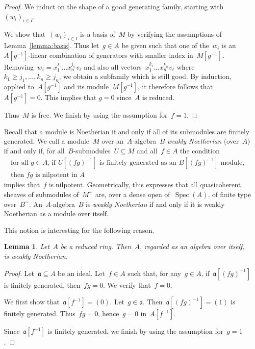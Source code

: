 \documentclass{amsart}
\theoremstyle{definition}
\theoremstyle{plain}
\newtheorem{lemma}[defn]{Lemma}
\theoremstyle{remark}
\newcommand{\aaa}{\mathfrak{a}}
\DeclareMathOperator{\Spec}{Spec}
\begin{document}
\begin{proof}
We induct on the shape of a good generating family, starting with~$(w_i)_{i \in I}$.

We show that~$(w_i)_{i \in I}$ is a basis of~$M$ by verifying the assumptions
of Lemma~\ref{lemma:basis}. Thus let~$g \in A$ be given such that one of
the~$w_i$ is an $A[g^{-1}]$-linear combination of generators with smaller index
in~$M[g^{-1}]$. Removing~$w_i = x_1^{j_1} \ldots x_n^{j_n} v_\ell$ and also all
vectors~$x_1^{k_1} \ldots x_n^{k_n} v_\ell$ where~$k_1 \geq j_1, \ldots, k_n
\geq j_n$, we obtain a subfamily which is still good. By induction, applied
to~$A[g^{-1}]$ and its module~$M[g^{-1}]$, it therefore follows that $A[g^{-1}] = 0$.
This implies that $g = 0$ since~$A$ is reduced.

Thus~$M$ is free. We finish by using the assumption for~$f = 1$.
\end{proof}

Recall that a module is Noetherian if and only if all of its submodules are
finitely generated. We call a module~$M$ over an~$A$-algebra~$B$ \emph{weakly
Noetherian} (over~$A$) if and only if, for all~$B$-submodules~$U \subseteq M$
and all~$f \in A$ the condition
\begin{multline*}
  \text{for all~$g \in A$, if $U[(fg)^{-1}]$ is finitely generated as
an~$B[(fg)^{-1}]$-module,} \\
  \text{then~$fg$ is nilpotent in~$A$} \end{multline*}
implies that~$f$ is nilpotent. Geometrically, this expresses that all
quasicoherent sheaves of submodules of~$M^\sim$ are, over a dense open
of~$\Spec(A)$, of finite type over~$B^\sim$. An~$A$-algebra~$B$
is \emph{weakly Noetherian} if and only if it is weakly Noetherian as a module
over itself.

This notion is interesting for the following reason.

\begin{lemma}\label{lemma:self-noetherian}
Let~$A$ be a reduced ring. Then~$A$, regarded as an algebra over itself, is
weakly Noetherian.\end{lemma}

\begin{proof}Let~$\aaa \subseteq A$ be an ideal. Let~$f \in A$ such that, for
any~$g \in A$, if~$\aaa[(fg)^{-1}]$ is finitely generated, then~$fg = 0$.
We verify that~$f = 0$.

We first show that~$\aaa[f^{-1}] = (0)$. Let~$g \in \aaa$. Then~$\aaa[(fg)^{-1}] =
(1)$ is finitely generated. Thus~$fg = 0$, hence~$g = 0$ in~$A[f^{-1}]$.

Since~$\aaa[f^{-1}]$ is finitely generated, we finish by using the
assumption for~$g = 1$.
\end{proof}
\end{document}

